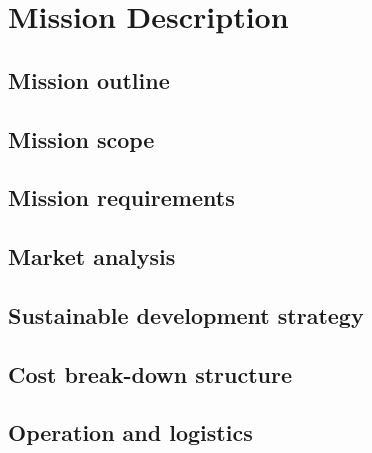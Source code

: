 \section{Mission Description}\label{cha:missiondescr}

\subsection{Mission outline} \label{sec:missionoutline}


\subsection{Mission scope} \label{sec:missionscope}


\subsection{Mission requirements} \label{sec:missionreq}


\subsection{Market analysis} \label{sec:marketanalysis}


\subsection{Sustainable development strategy} \label{sec:sustainable}


\subsection{Cost break-down structure} \label{sec:costbreakdown}


\subsection{Operation and logistics} \label{sec:operations}



